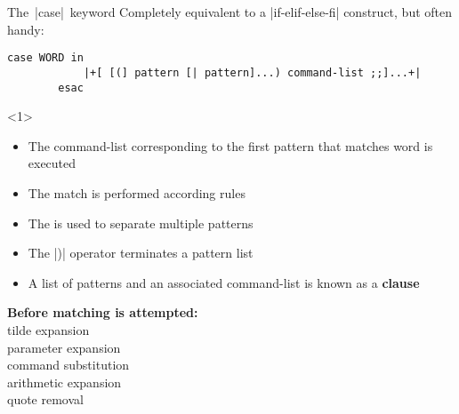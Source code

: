 
\begin{frame}[fragile]{The \,\bash|case|\, keyword}
    \vspace{-3mm}
    Completely equivalent to a \bash|if-elif-else-fi| construct, but often handy:
    \medskip
    \begin{lstlisting}[style=MyBash, numbers=none, belowskip=-5mm]
        case WORD in
            |+[ [(] pattern [| pattern]...) command-list ;;]...+|
        esac
    \end{lstlisting}
    \vspace{2mm}
    \begin{overlayarea}{\textwidth}{\textheight}
        \begin{onlyenv}<1>
            \begin{itemize}
                \setlength{\itemsep}{0mm}
                \item The command-list corresponding to the first pattern that matches word is executed
                \item The match is performed according  rules
                \item The \bash{|} is used to separate multiple patterns
                \item The \bash|)| operator terminates a pattern list
                \item A list of patterns and an associated command-list is known as a \textbf{clause}
            \end{itemize}
            \vspace{-3mm}
            \begin{center}
                \alert{\textbf{Before matching is attempted:}}\\[0.3em]
                tilde expansion\\
                parameter expansion\\
                command substitution\\
                arithmetic expansion\\
                quote removal
            \end{center}
        \end{onlyenv}
\end{overlayarea}
\end{frame}
